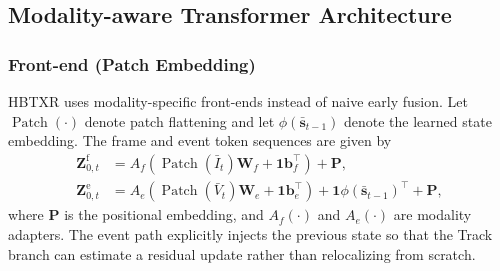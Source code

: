\documentclass[journal]{IEEEtran}
\begin{document}
\subsection{Modality-aware Transformer Architecture}

\subsubsection{Front-end (Patch Embedding)}
HBTXR uses modality-specific front-ends instead of naive early fusion. Let $\operatorname{Patch}(\cdot)$ denote patch flattening and let $\phi(\bar{\mathbf s}_{t-1})$ denote the learned state embedding. The frame and event token sequences are given by
\begin{align}
\mathbf Z_{0,t}^{\mathrm{f}} &=
A_f\!\left(\operatorname{Patch}(\bar I_t)\mathbf W_f + \mathbf 1\mathbf b_f^{\top}\right)+\mathbf P,
\\
\mathbf Z_{0,t}^{\mathrm{e}} &=
A_e\!\left(\operatorname{Patch}(\bar V_t)\mathbf W_e + \mathbf 1\mathbf b_e^{\top}\right)
+ \mathbf 1\phi(\bar{\mathbf s}_{t-1})^{\top}+\mathbf P,
\end{align}
where $\mathbf P$ is the positional embedding, and $A_f(\cdot)$ and $A_e(\cdot)$ are modality adapters. The event path explicitly injects the previous state so that the Track branch can estimate a residual update rather than relocalizing from scratch.
\end{document}
